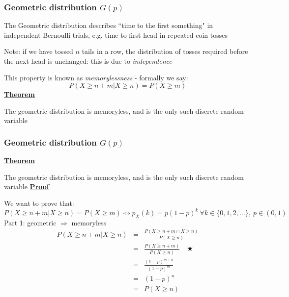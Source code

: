 \documentclass[t,8pt]{beamer}%
\begin{document}
	\begin{frame}
		\frametitle{Geometric distribution $G(p)$}
		The Geometric distribution describes ``time to the first something" in independent Bernoulli trials, e.g. time to first head in repeated coin tosses \par
		Note: if we have tossed $n$ tails in a row, the distribution of tosses required before the next head is unchanged: this is due to {\it independence} \par
		This property is known as {\it memorylessness} - formally we say:
		$$P(X\geq n+m\vert X\geq n)=P(X\geq m)$$
		{\bf\underline{Theorem}} \par
		The geometric distribution is memoryless, and is the only such discrete random variable
	\end{frame}

	\begin{frame}
		\frametitle{Geometric distribution $G(p)$}
		{\bf\underline{Theorem}} \par
		The geometric distribution is memoryless, and is the only such discrete random variable
        {\bf\underline{Proof}} \par
        We want to prove that:
        $$P(X\geq n+m\vert X\geq n)=P(X\geq m)\Leftrightarrow p_X(k)=p(1-p)^k\ \forall k\in\{0,1,2,\dots\},\ p\in(0,1)$$
		Part 1: geometric $\Rightarrow$ memoryless
        \begin{eqnarray*}
            P(X\geq n+m\vert X\geq n)&=&\frac{P(X\geq n+m\cap X\geq n)}{P(X\geq n)}\\
            &=&\frac{P(X\geq n+m)}{P(X\geq n)}\quad\bigstar\\
            &=&\frac{(1-p)^{m+n}}{(1-p)^m}\\
            &=&(1-p)^n\\
            &=&P(X\geq n)
        \end{eqnarray*}
	\end{frame}
\end{document}
